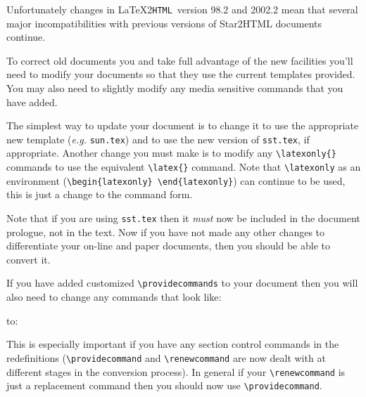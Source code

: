 \documentclass[twoside,11pt,nolof]{starlink}
\providecommand{\latextohtml}{\LaTeX2\texttt{HTML}}
\begin{document}
Unfortunately changes in \latextohtml\ version 98.2 and 2002.2
mean that several major incompatibilities with previous versions
of Star2HTML documents continue.

To correct old documents you and take full advantage of the new facilities
you'll need to modify your documents so that they use the current templates
provided. You may also need to slightly modify any media sensitive commands
that you have added.

The simplest way to update your document is to change it to use the
appropriate new template (\textit{e.g.} \verb#sun.tex#) and to use the
new version of \verb#sst.tex#, if appropriate. Another change you must
make is to modify any \verb#\latexonly{}# commands to use the
equivalent \verb#\latex{}# command. Note that \verb#\latexonly# as an
environment (\verb#\begin{latexonly} \end{latexonly}#) can continue to be
used, this is just a change to the command form.

Note that if you are using \verb#sst.tex# then it \emph{must} now be
included in the document prologue, not in the text. Now if you have
not made any other changes to differentiate your on-line and paper
documents, then you should be able to convert it.

If you have added customized \verb#\providecommands# to your document then
you will also need to change any commands that look like:
\begin{terminalv}
\providecommand{\mycommand}{this version is only for LaTeX}
\begin{htmlonly}
    \renewcommand{\mycommand}{this version is only for LaTeX2HTML}
\end{htmlonly}
\end{terminalv}
to:
\begin{terminalv}
\providecommand{\mycommand}{this version is only for LaTeX}
\begin{htmlonly}
    \providecommand{\mycommand}{this version is only for LaTeX2HTML}
\end{htmlonly}
\end{terminalv}
This is especially important if you have any section control commands
in the redefinitions (\verb#\providecommand# and \verb#\renewcommand# are
now dealt with at different stages in the conversion process). In
general if your \verb#\renewcommand# is just a replacement command then
you should now use \verb#\providecommand#.
\end{document}
